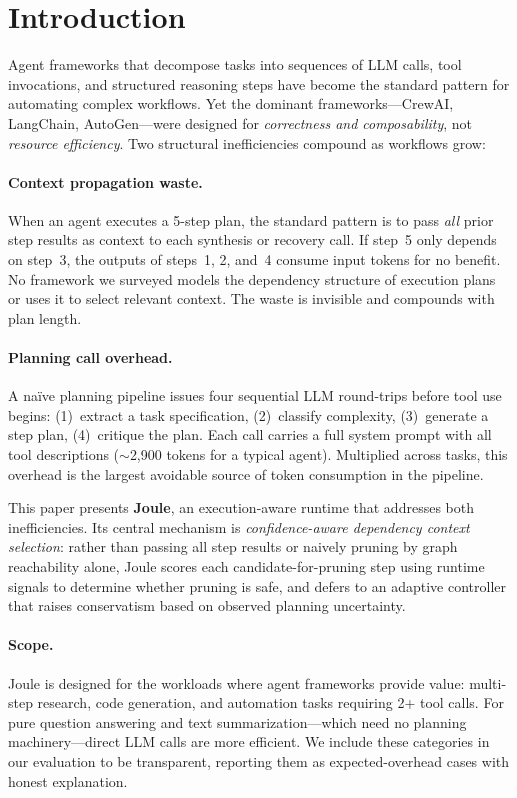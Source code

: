 \documentclass[sigconf,authordraft]{acmart}
\begin{document}
\section{Introduction}
\label{sec:intro}

Agent frameworks that decompose tasks into sequences of LLM calls, tool invocations, and structured reasoning steps have become the standard pattern for automating complex workflows.
Yet the dominant frameworks---CrewAI, LangChain, AutoGen---were designed for \emph{correctness and composability}, not \emph{resource efficiency}.
Two structural inefficiencies compound as workflows grow:

\paragraph{Context propagation waste.}
When an agent executes a 5-step plan, the standard pattern is to pass \emph{all} prior step results as context to each synthesis or recovery call.
If step~5 only depends on step~3, the outputs of steps~1, 2, and~4 consume input tokens for no benefit.
No framework we surveyed models the dependency structure of execution plans or uses it to select relevant context.
The waste is invisible and compounds with plan length.

\paragraph{Planning call overhead.}
A na\"{i}ve planning pipeline issues four sequential LLM round-trips before tool use begins: (1)~extract a task specification, (2)~classify complexity, (3)~generate a step plan, (4)~critique the plan.
Each call carries a full system prompt with all tool descriptions ($\sim$2,900 tokens for a typical agent).
Multiplied across tasks, this overhead is the largest avoidable source of token consumption in the pipeline.

This paper presents \textbf{Joule}, an execution-aware runtime that addresses both inefficiencies.
Its central mechanism is \emph{confidence-aware dependency context selection}: rather than passing all step results or naively pruning by graph reachability alone, Joule scores each candidate-for-pruning step using runtime signals to determine whether pruning is safe, and defers to an adaptive controller that raises conservatism based on observed planning uncertainty.

\paragraph{Scope.}
Joule is designed for the workloads where agent frameworks provide value: multi-step research, code generation, and automation tasks requiring 2+ tool calls.
For pure question answering and text summarization---which need no planning machinery---direct LLM calls are more efficient.
We include these categories in our evaluation to be transparent, reporting them as expected-overhead cases with honest explanation.
\end{document}
